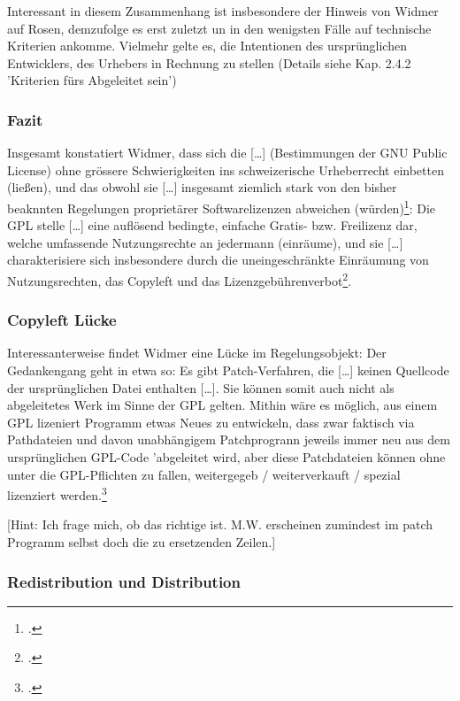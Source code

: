 \documentclass[DIV=calc,BCOR=5mm,11pt,headings=small,oneside,abstract=true, toc=bib]{scrartcl}
\begin{document}
Interessant in diesem Zusammenhang ist insbesondere der Hinweis von Widmer auf
Rosen, demzufolge es erst zuletzt un in den wenigsten Fälle auf technische
Kriterien ankomme. Vielmehr gelte es, die Intentionen des ursprünglichen
Entwicklers, des Urhebers in Rechnung zu stellen (Details siehe Kap. 2.4.2
'Kriterien fürs Abgeleitet sein')

\subsubsection{Fazit}

Insgesamt konstatiert Widmer, dass sich die \glqq{}[\ldots] (Bestimmungen der
GNU Public License) ohne grössere Schwierigkeiten ins schweizerische
Urheberrecht einbetten (ließen)\grqq{}, und das obwohl sie \glqq{}[\ldots]
insgesamt ziemlich stark von den bisher beaknnten Regelungen proprietärer
Softwarelizenzen abweichen (würden)\grqq{}\footcite[vgl.][182]{Widmer2003a}: Die
GPL stelle \glqq{}[\ldots] eine auflösend bedingte, einfache Gratis- bzw.
Freilizenz dar, welche umfassende Nutzungsrechte an jedermann (einräume)\grqq{},
und sie \glqq{}[\ldots] charakterisiere sich insbesondere durch die
uneingeschränkte Einräumung von Nutzungsrechten, das Copyleft und das
Lizenzgebührenverbot\grqq{}\footcite[vgl.][182]{Widmer2003a}.

\subsubsection{Copyleft Lücke}
Interessanterweise findet Widmer eine \glqq{}Lücke im Regelungsobjekt\grqq{}:
Der Gedankengang geht in etwa so: Es gibt Patch-Verfahren, die \glqq{}[\ldots]
keinen Quellcode der ursprünglichen Datei enthalten [\ldots]\grqq{}. Sie können
somit auch nicht als \glqq{}abgeleitetes Werk im Sinne der GPL\grqq{} gelten.
Mithin wäre es möglich, aus einem GPL lizeniert Programm etwas Neues zu
entwickeln, dass zwar faktisch via Pathdateien und davon unabhängigem
Patchprogrann jeweils immer neu aus dem ursprünglichen GPL-Code 'abgeleitet
wird, aber diese Patchdateien können ohne unter die GPL-Pflichten zu fallen,
weitergegeb / weiterverkauft / spezial lizenziert
werden.\footcite[vgl.][144f]{Widmer2003a}

[Hint: Ich frage mich, ob das richtige ist. M.W. erscheinen zumindest im patch
Programm selbst doch die zu ersetzenden Zeilen.]


\subsubsection{Redistribution und Distribution}
\end{document}
